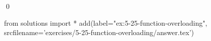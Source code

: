 
\begin{ex}
  \label{ex:5-25-function-overloading}
  
  \qed
\end{ex}
\begin{python0}
from solutions import *
add(label="ex:5-25-function-overloading",
    srcfilename='exercises/5-25-function-overloading/answer.tex')
\end{python0}
